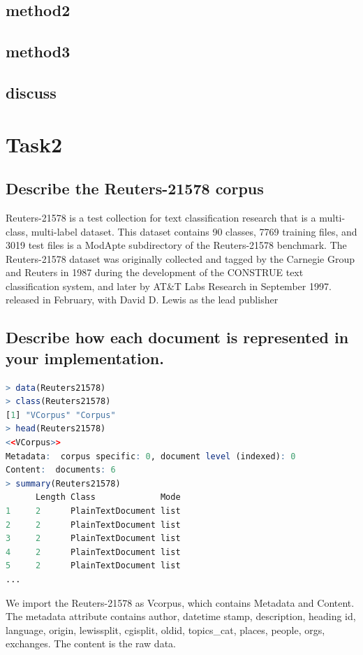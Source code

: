 \documentclass{article}
\begin{document}
\subsection{method2}
\subsection{method3}
\subsection{discuss}


\section{Task2}
\subsection{Describe the Reuters-21578 corpus}
Reuters-21578 is a test collection for text classification research that is a multi-class, multi-label dataset. This dataset contains 90 classes, 7769 training files, and 3019 test files is a ModApte subdirectory of the Reuters-21578 benchmark. The Reuters-21578 dataset was originally collected and tagged by the Carnegie Group and Reuters in 1987 during the development of the CONSTRUE text classification system, and later by AT\&T Labs Research in September 1997. released in February, with David D. Lewis as the lead publisher

\subsection{Describe how each document is represented in your implementation.}
\begin{lstlisting}[language=R]
> data(Reuters21578)
> class(Reuters21578)
[1] "VCorpus" "Corpus" 
> head(Reuters21578)
<<VCorpus>>
Metadata:  corpus specific: 0, document level (indexed): 0
Content:  documents: 6
> summary(Reuters21578)
      Length Class             Mode
1     2      PlainTextDocument list
2     2      PlainTextDocument list
3     2      PlainTextDocument list
4     2      PlainTextDocument list
5     2      PlainTextDocument list
...
\end{lstlisting}

We import the Reuters-21578 as Vcorpus, which contains Metadata and Content. The metadata attribute contains author, datetime stamp, description, heading id, language, origin, lewissplit, cgisplit, oldid, topics\_cat, places, people, orgs, exchanges. The content is the raw data.
\end{document}
